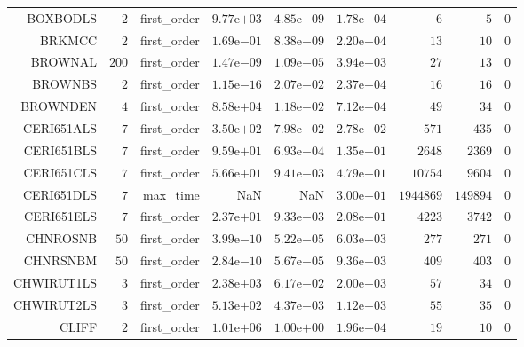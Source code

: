 \begin{longtable}{rrrrrrrrr}
BOXBODLS & \(     2\) & first\_order & \( 9.77\)e\(+03\) & \( 4.85\)e\(-09\) & \( 1.78\)e\(-04\) & \(     6\) & \(     5\) & \(     0\) \\
BRKMCC & \(     2\) & first\_order & \( 1.69\)e\(-01\) & \( 8.38\)e\(-09\) & \( 2.20\)e\(-04\) & \(    13\) & \(    10\) & \(     0\) \\
BROWNAL & \(   200\) & first\_order & \( 1.47\)e\(-09\) & \( 1.09\)e\(-05\) & \( 3.94\)e\(-03\) & \(    27\) & \(    13\) & \(     0\) \\
BROWNBS & \(     2\) & first\_order & \( 1.15\)e\(-16\) & \( 2.07\)e\(-02\) & \( 2.37\)e\(-04\) & \(    16\) & \(    16\) & \(     0\) \\
BROWNDEN & \(     4\) & first\_order & \( 8.58\)e\(+04\) & \( 1.18\)e\(-02\) & \( 7.12\)e\(-04\) & \(    49\) & \(    34\) & \(     0\) \\
CERI651ALS & \(     7\) & first\_order & \( 3.50\)e\(+02\) & \( 7.98\)e\(-02\) & \( 2.78\)e\(-02\) & \(   571\) & \(   435\) & \(     0\) \\
CERI651BLS & \(     7\) & first\_order & \( 9.59\)e\(+01\) & \( 6.93\)e\(-04\) & \( 1.35\)e\(-01\) & \(  2648\) & \(  2369\) & \(     0\) \\
CERI651CLS & \(     7\) & first\_order & \( 5.66\)e\(+01\) & \( 9.41\)e\(-03\) & \( 4.79\)e\(-01\) & \( 10754\) & \(  9604\) & \(     0\) \\
CERI651DLS & \(     7\) & max\_time &       NaN &       NaN & \( 3.00\)e\(+01\) & \(1944869\) & \(149894\) & \(     0\) \\
CERI651ELS & \(     7\) & first\_order & \( 2.37\)e\(+01\) & \( 9.33\)e\(-03\) & \( 2.08\)e\(-01\) & \(  4223\) & \(  3742\) & \(     0\) \\
CHNROSNB & \(    50\) & first\_order & \( 3.99\)e\(-10\) & \( 5.22\)e\(-05\) & \( 6.03\)e\(-03\) & \(   277\) & \(   271\) & \(     0\) \\
CHNRSNBM & \(    50\) & first\_order & \( 2.84\)e\(-10\) & \( 5.67\)e\(-05\) & \( 9.36\)e\(-03\) & \(   409\) & \(   403\) & \(     0\) \\
CHWIRUT1LS & \(     3\) & first\_order & \( 2.38\)e\(+03\) & \( 6.17\)e\(-02\) & \( 2.00\)e\(-03\) & \(    57\) & \(    34\) & \(     0\) \\
CHWIRUT2LS & \(     3\) & first\_order & \( 5.13\)e\(+02\) & \( 4.37\)e\(-03\) & \( 1.12\)e\(-03\) & \(    55\) & \(    35\) & \(     0\) \\
CLIFF & \(     2\) & first\_order & \( 1.01\)e\(+06\) & \( 1.00\)e\(+00\) & \( 1.96\)e\(-04\) & \(    19\) & \(    10\) & \(     0\) \\

\end{longtable}
